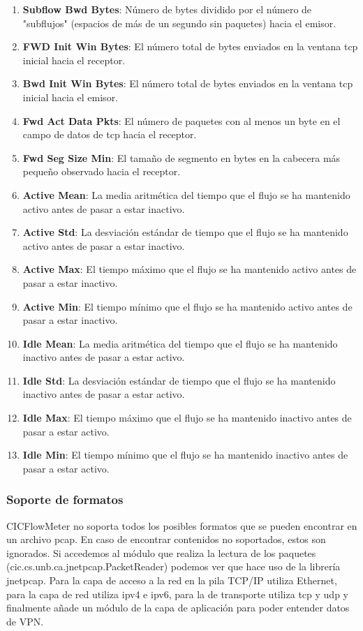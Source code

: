 \begin{enumerate}
    \item \textbf{Subflow Bwd Bytes}: Número de bytes dividido por el número de "subflujos" (espacios de más de un segundo sin paquetes) hacia el emisor.
    \item \textbf{FWD Init Win Bytes}: El número total de bytes enviados en la ventana \acrshort{tcp} inicial hacia el receptor.
    \item \textbf{Bwd Init Win Bytes}: El número total de bytes enviados en la ventana \acrshort{tcp} inicial hacia el emisor.
    \item \textbf{Fwd Act Data Pkts}: El número de paquetes con al menos un byte en el campo de datos de \acrshort{tcp} hacia el receptor.
    \item \textbf{Fwd Seg Size Min}: El tamaño de segmento en bytes en la cabecera más pequeño observado hacia el receptor.
    \item \textbf{Active Mean}: La media aritmética del tiempo que el flujo se ha mantenido activo antes de pasar a estar inactivo.
    \item \textbf{Active Std}: La desviación estándar de tiempo que el flujo se ha mantenido activo antes de pasar a estar inactivo.
    \item \textbf{Active Max}: El tiempo máximo que el flujo se ha mantenido activo antes de pasar a estar inactivo.
    \item \textbf{Active Min}: El tiempo mínimo que el flujo se ha mantenido activo antes de pasar a estar inactivo.
    \item \textbf{Idle Mean}: La media aritmética del tiempo que el flujo se ha mantenido inactivo antes de pasar a estar activo.
    \item \textbf{Idle Std}: La desviación estándar de tiempo que el flujo se ha mantenido inactivo antes de pasar a estar activo.
    \item \textbf{Idle Max}: El tiempo máximo que el flujo se ha mantenido inactivo antes de pasar a estar activo.
    \item \textbf{Idle Min}: El tiempo mínimo que el flujo se ha mantenido inactivo antes de pasar a estar activo.
\end{enumerate}

\subsubsection{Soporte de formatos}

CICFlowMeter no soporta todos los posibles formatos que se pueden encontrar en un archivo pcap. En caso de encontrar contenidos no soportados, estos son ignorados. Si accedemos al módulo que realiza la lectura de los paquetes (cic.cs.unb.ca.jnetpcap.PacketReader) podemos ver que hace uso de la librería jnetpcap. Para la capa de acceso a la red en la pila TCP/IP utiliza Ethernet, para la capa de red utiliza \acrshort{ipv4} e \acrshort{ipv6}, para la de transporte utiliza \acrshort{tcp} y \acrshort{udp} y finalmente añade un módulo de la capa de aplicación para poder entender datos de VPN.


